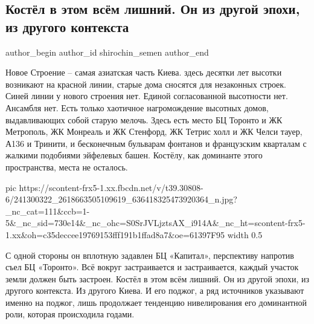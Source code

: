  
 
 
 
 
 
\subsection{Костёл в этом всём лишний. Он из другой эпохи, из другого контекста}
\label{sec:04_08_2021.fb.shirochin_semen.1.kostel_pozhar}
 
\ifcmt
 author_begin
   author_id shirochin_semen
 author_end
\fi

Новое Строение – самая азиатская часть Киева. здесь десятки лет высотки
возникают на красной линии, старые дома сносятся для незаконных строек. Синей
линии у нового строения нет. Единой согласованной высотности нет. Ансамбля нет.
Есть только хаотичное нагромождение высотных домов, выдавливающих собой старую
мелочь. Здесь есть место БЦ Торонто и ЖК Метрополь, ЖК Монреаль и ЖК Стенфорд,
ЖК Тетрис холл и ЖК Челси тауер, А136 и Тринити, и бесконечным бульварам
фонтанов и французским кварталам с жалкими подобиями эйфелевых башен. Костёлу,
как доминанте этого пространства, места не осталось. 

\ifcmt
  pic https://scontent-frx5-1.xx.fbcdn.net/v/t39.30808-6/241300322_2618663505109619_636418325473920364_n.jpg?_nc_cat=111&ccb=1-5&_nc_sid=730e14&_nc_ohc=S0SrJVLjztsAX_i914A&_nc_ht=scontent-frx5-1.xx&oh=c35deccee19769153fff191b1ffad8a7&oe=61397F95
  width 0.5
\fi

С одной стороны он
вплотную задавлен БЦ «Капитал», перспективу  напротив съел БЦ «Торонто». Всё
вокруг застраивается и застраивается, каждый участок земли должен быть
застроен. Костёл в этом всём лишний. Он из другой эпохи, из другого контекста.
Из другого Киева. И его поджог, а ряд источников указывают именно на поджог,
лишь продолжает тенденцию нивелирования его доминантной роли, которая
происходила годами.

